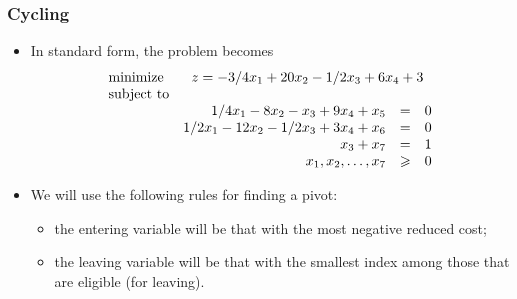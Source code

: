 \documentclass{beamer}
\theoremstyle{plain}
\let\ge\geqslant
\begin{document}
\begin{frame}\frametitle{Cycling}
\justifying

\begin{itemize}
\justifying

\item In standard form, the problem becomes
\[ \begin{array}{lrcr}
\textrm{minimize} & \multicolumn{3}{c}{z =  -3/4x_1 + 20x_2 - 1/2x_3 + 6 x_4 + 3}  \\
\textrm{subject to} & \\
& 1/4x_1 - 8x_2 - x_3 + 9x_4 + x_5 & = & 0\\
& 1/2x_1 - 12x_2 - 1/2x_3 + 3x_4 + x_6 & =  & 0 \\
& x_3 + x_7 & = & 1\\
& x_1, x_2, \ldots, x_7 & \ge & 0
\end{array}
\]

\item We will use the following rules for finding a pivot:

\begin{itemize}

\item the entering variable will be that with the most negative reduced cost;

\item the leaving variable will be that with the smallest index among those that are eligible (for leaving).

\end{itemize}

\end{itemize}

\end{frame}
\end{document}
